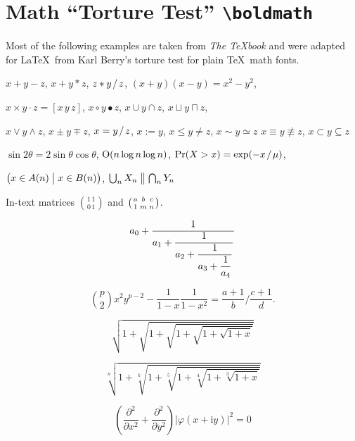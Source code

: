 \documentclass[11pt, a4paper, oneside]{article}
\newcommand{\mathup}[1]{\mathrm{#1}}
\newcommand*{\divslash}{%
	\mathbin{%
		\nonscript\mskip-2mu / \nonscript\mskip-2mu%
	}%
}  %
\theoremstyle{Plain}
\theoremstyle{Definition}
\theoremstyle{Remark}
\begin{document}
\begin{appendix}
	\clearpage

	\begingroup
	\bfseries\boldmath

	\section{Math \texorpdfstring{``}{“}Torture Test\texorpdfstring{''}{”} \texttt{\textbackslash boldmath}}

	Most of the following examples are taken from \textit{The \TeX book} \citep[][see \url{https://ctan.org/pkg/texbook}]{knuth:ct:a} and were adapted for \LaTeX\ from Karl Berry's torture test for plain \TeX\ math fonts.

	\noindent $x + y - z$, \quad $x + y * z$, \quad $z * y \divslash z$, \quad
	$(x+y)(x-y) = x^2 - y^2$,

	\noindent $x \times y \cdot z = [x\, y\, z]$, \quad $x\circ y \bullet z$, \quad
	$x\cup y \cap z$, \quad $x\sqcup y \sqcap z$, \quad

	\noindent $x \vee y \wedge z$, \quad $x\pm y\mp z$, \quad
	$x=y \divslash z$, \;\; $x:=y$, \;\; $x\le y \ne z$, \;\; $x \sim y \simeq z$
	$x \equiv y \nequiv z$, \;\; $x\subset y \subseteq z$

	\noindent $\sin2\theta=2\sin\theta\cos\theta$, \quad
	$\hbox{O}(n\log n\log n)$, \quad
	$\Pr(X>x)=\exp(-x \divslash \mu)$,

	\noindent $\bigl(x\in A(n)\bigm|x\in B(n)\bigr)$, \quad
	$\bigcup_n X_n\bigm\|\bigcap_n Y_n$


	\noindent In-text matrices $\binom{1\,1}{0\,1}$ and $\bigl(\genfrac{}{}{0pt}{}{a}{1}\genfrac{}{}{0pt}{}{b}{m}\genfrac{}{}{0pt}{}{c}{n}\bigr)$.


	$$a_0+\frac1{\displaystyle a_1 +
		{\strut \frac1{\displaystyle a_2 +
				{\strut \frac1{\displaystyle a_3 +
						{\strut \frac1{\displaystyle a_4}}}}}}}$$


	$$\binom{p}{2}x^2y^{p-2} - \frac1{1 - x}\frac{1}{1 - x^2}
	=
	\frac{a+1}{b}\bigg/\frac{c+1}{d}.$$


	$$\sqrt{1+\sqrt{1+\sqrt{1+\sqrt{1+\sqrt{1+x}}}}}$$

	$$\sqrt[n]{1+\sqrt[k]{1+\sqrt[5]{1+\sqrt[4]{1+\sqrt[3]{1+x}}}}}$$


	$$\left(\frac{\partial^2}{\partial x^2} + \frac{\partial^2}{\partial y^2}\right)
	\bigl|\varphi(x+\mathup{i}y)\bigr|^2=0$$


\end{appendix}
\end{document}
